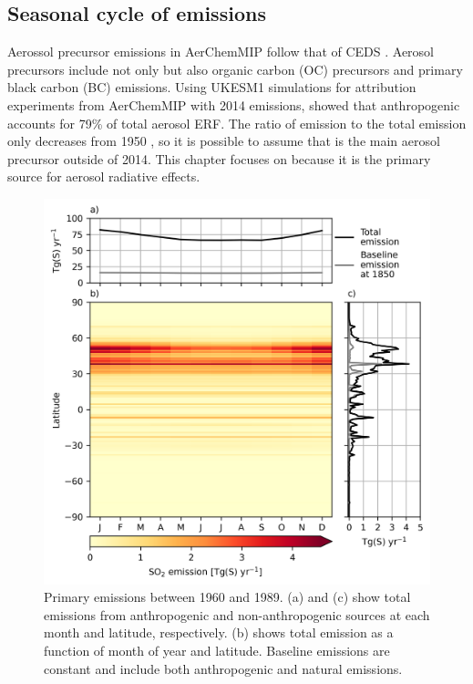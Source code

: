 \subsection{Seasonal cycle of \textsoo{} emissions}

Aerossol precursor emissions in AerChemMIP follow that of CEDS \citep{HoeslyHistoricalEmissions2017}. Aerosol precursors include not only  but also organic carbon (OC) precursors and primary black carbon (BC) emissions. Using UKESM1 simulations for attribution experiments from AerChemMIP with 2014 emissions, \citet{oconnorAssessmentPreindustrialPresentday2021} showed that anthropogenic  accounts for 79\% of total aerosol ERF. The ratio of  emission to the total emission only decreases from 1950 \citep{hoeslyHistorical175020142018}, so it is possible to assume that  is the main aerosol precursor outside of 2014. This chapter focuses on  because it is the primary source for aerosol radiative effects.  

\begin{figure}
    \centering
    \includegraphics{Chapter4/Figs/emiso2_monthly_pothole.png}
    \caption[Primary  emissions between 1960 and 1989]{Primary  emissions between 1960 and 1989. (a) and (c) show total  emissions from anthropogenic and non-anthropogenic sources at each month and latitude, respectively. (b) shows total emission as a function of month of year and latitude. Baseline emissions are constant and include both anthropogenic and natural emissions.}
    \label{fig:ch4:seasonal-emission}
\end{figure}

